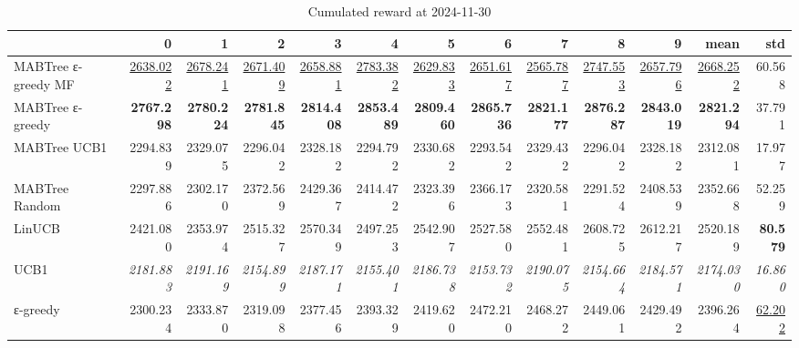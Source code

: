 \begin{table}
\caption{Cumulated reward at 2024-11-30}
\begin{tabular}{lrrrrrrrrrrrr}
\toprule
 & 0 & 1 & 2 & 3 & 4 & 5 & 6 & 7 & 8 & 9 & mean & std \\
\midrule
MABTree ε-greedy MF & \underline{2638.022} & \underline{2678.241} & \underline{2671.409} & \underline{2658.881} & \underline{2783.382} & \underline{2629.833} & \underline{2651.617} & \underline{2565.787} & \underline{2747.553} & \underline{2657.796} & \underline{2668.252} & 60.568 \\
MABTree ε-greedy & \textbf{2767.298} & \textbf{2780.224} & \textbf{2781.845} & \textbf{2814.408} & \textbf{2853.489} & \textbf{2809.460} & \textbf{2865.736} & \textbf{2821.177} & \textbf{2876.287} & \textbf{2843.019} & \textbf{2821.294} & 37.791 \\
MABTree UCB1 & 2294.839 & 2329.075 & 2296.042 & 2328.182 & 2294.792 & 2330.682 & 2293.542 & 2329.432 & 2296.042 & 2328.182 & 2312.081 & 17.977 \\
MABTree Random & 2297.886 & 2302.170 & 2372.569 & 2429.367 & 2414.472 & 2323.396 & 2366.173 & 2320.581 & 2291.524 & 2408.539 & 2352.668 & 52.259 \\
LinUCB & 2421.080 & 2353.974 & 2515.327 & 2570.349 & 2497.253 & 2542.907 & 2527.580 & 2552.481 & 2608.725 & 2612.217 & 2520.189 & \textbf{80.579} \\
UCB1 & \textit{2181.883} & \textit{2191.169} & \textit{2154.899} & \textit{2187.171} & \textit{2155.401} & \textit{2186.738} & \textit{2153.732} & \textit{2190.075} & \textit{2154.664} & \textit{2184.571} & \textit{2174.030} & \textit{16.860} \\
ε-greedy & 2300.234 & 2333.870 & 2319.098 & 2377.456 & 2393.329 & 2419.620 & 2472.210 & 2468.272 & 2449.061 & 2429.492 & 2396.264 & \underline{62.202} \\
\bottomrule
\end{tabular}
\end{table}
